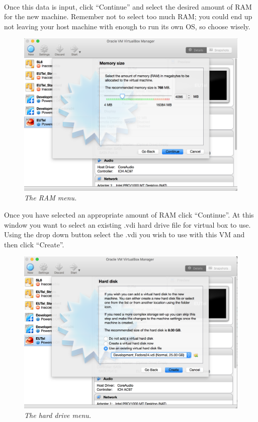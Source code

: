 \documentclass[11pt]{article}
\begin{document}
\paragraph{}
Once this data is input, click ``Continue'' and select the desired amount of RAM for the new machine. Remember not to select too much RAM; you could end up not leaving your host machine with enough to run its own OS, so choose wisely.
\begin{figure}[!ht]
	\centering
	\includegraphics[scale=0.3]{images/choose_ram.png}
	\caption{\textit{The RAM menu.}}
\end{figure}
Once you have selected an appropriate amount of RAM click ``Continue''. At this window you want to select an existing .vdi hard drive file for virtual box to use. Using the drop down button select the .vdi you wish to use with this VM and then click ``Create''.
\begin{figure}[!ht]
	\centering
	\includegraphics[scale=0.3]{images/add_hdd.png}
	\caption{\textit{The hard drive menu.}}
\end{figure}
\end{document}

